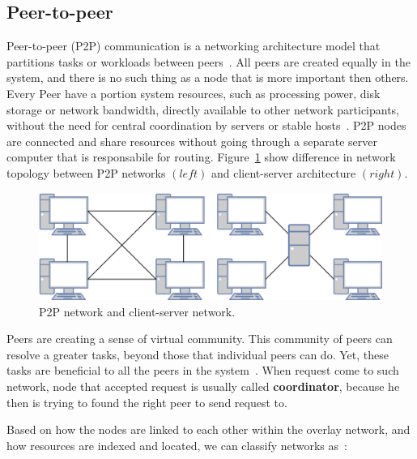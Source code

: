 \subsection{Peer-to-peer}\label{sec:p2p_networks}
%
Peer-to-peer (P2P) communication is a networking architecture model that partitions tasks or workloads between peers~\cite{Schollmeier01}. All peers are created equally in the system, and there is no such thing as a node that is more important then others. Every Peer have a portion system resources, such as processing power, disk storage or network bandwidth, directly available to other network participants, without the need for central coordination by servers or stable hosts~\cite{Schollmeier01}. P2P nodes are connected and share resources without going through a separate server computer that is responsabile for routing. Figure~\ref{fig:fig2} show difference in network topology between P2P networks $(left)$ and client-server architecture $(right)$.

\begin{figure}[H]
	\begin{center}
		\includegraphics[scale=0.7]{images/Figure2.png}
	\end{center}
	\vspace{-0.6cm}
	\caption{P2P network and client-server network.}
	\label{fig:fig2}
\end{figure}

Peers are creating a sense of virtual community. This community of peers can resolve a greater tasks, beyond those that individual peers can do. Yet, these tasks are beneficial to all the peers in the system~\cite{BandaraJ13}. When request come to such network, node that accepted request is usually called \textbf{coordinator}, because he then is trying to found the right peer to send request to.

Based on how the nodes are linked to each other within the overlay network, and how resources are indexed and located, we can classify networks as~\cite{KamelSE07}:

